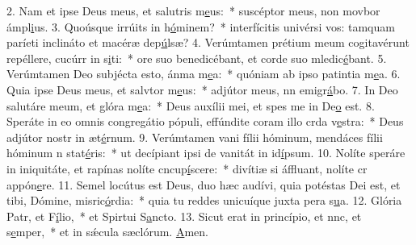 2. Nam et ipse Deus meus, et salutris m\uline{e}us:~* suscéptor meus, non movbor ámpl\uline{i}us.
3. Quoúsque irrúits in h\uline{ó}minem?~* interfícitis univérsi vos: tamquam paríeti inclináto et macéræ dep\uline{ú}lsæ?
4. Verúmtamen prétium meum cogitavérunt repéllere, cucúrr in s\uline{i}ti:~* ore suo benedicébant, et corde suo mledic\uline{é}bant.
5. Verúmtamen Deo subjécta esto, ánma m\uline{e}a:~* quóniam ab ipso patintia m\uline{e}a.
6. Quia ipse Deus meus, et salvtor m\uline{e}us:~* adjútor meus, nn emigr\uline{á}bo.
7. In Deo salutáre meum, et glóra m\uline{e}a:~* Deus auxílii mei, et spes me in De\uline{o} est.
8. Speráte in eo omnis congregátio pópuli, effúndite coram illo crda v\uline{e}stra:~* Deus adjútor nostr in æt\uline{é}rnum.
9. Verúmtamen vani fílii hóminum, mendáces fílii hóminum n stat\uline{é}ris:~* ut decípiant ipsi de vanitát in id\uline{í}psum.
10. Nolíte speráre in iniquitáte, et rapínas nolíte cncup\uline{í}scere:~* divítiæ si áffluant, nolíte cr appón\uline{e}re.
11. Semel locútus est Deus, duo hæc audívi, quia potéstas Dei est, et tibi, Dómine, misric\uline{ó}rdia:~* quia tu reddes unicuíque juxta pera s\uline{u}a.
12. Glória Patr, et F\uline{í}lio,~* et Spirtui S\uline{a}ncto.
13. Sicut erat in princípio, et nnc, et s\uline{e}mper,~* et in sǽcula sæclórum. \uline{A}men.
